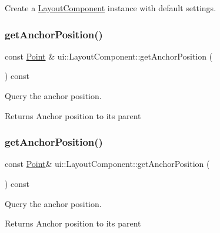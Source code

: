 Create a \hyperlink{classui_1_1LayoutComponent}{Layout\+Component} instance with default settings. \mbox{\label{classui_1_1LayoutComponent_a5113f246904b0d301db22cd39d322e15}} 
\subsubsection{\texorpdfstring{get\+Anchor\+Position()}{getAnchorPosition()}\hspace{0.1cm}{\footnotesize\ttfamily [1/2]}}
{\footnotesize\ttfamily const \hyperlink{classVec2}{Point} \& ui\+::\+Layout\+Component\+::get\+Anchor\+Position (\begin{DoxyParamCaption}{ }\end{DoxyParamCaption}) const}

Query the anchor position. \begin{DoxyReturn}{Returns}
Anchor position to it\textquotesingle{}s parent 
\end{DoxyReturn}
\mbox{\label{classui_1_1LayoutComponent_a942813605e5bb99f6722e8cafe82f87a}} 
\subsubsection{\texorpdfstring{get\+Anchor\+Position()}{getAnchorPosition()}\hspace{0.1cm}{\footnotesize\ttfamily [2/2]}}
{\footnotesize\ttfamily const \hyperlink{classVec2}{Point}\& ui\+::\+Layout\+Component\+::get\+Anchor\+Position (\begin{DoxyParamCaption}{ }\end{DoxyParamCaption}) const}

Query the anchor position. \begin{DoxyReturn}{Returns}
Anchor position to it\textquotesingle{}s parent 
\end{DoxyReturn}
\mbox{\label{classui_1_1LayoutComponent_a264d31acf95b9361026acbd2ebf54e12}} 
